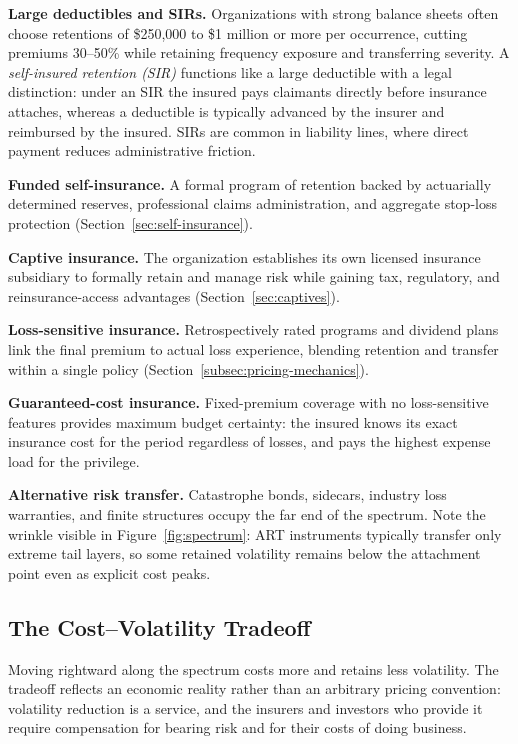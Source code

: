\documentclass[11pt,openany]{book}
\begin{document}
\textbf{Large deductibles and SIRs.} Organizations with strong balance sheets
often choose retentions of \$250,000 to \$1 million or more per occurrence,
cutting premiums 30--50\% while retaining frequency exposure and transferring
severity. A \emph{self-insured retention (SIR)} functions like a large
deductible with a legal distinction: under an SIR the insured pays claimants
directly before insurance attaches, whereas a deductible is typically
advanced by the insurer and reimbursed by the insured. SIRs are common in
liability lines, where direct payment reduces administrative friction.

\textbf{Funded self-insurance.} A formal program of retention backed by
actuarially determined reserves, professional claims administration, and
aggregate stop-loss protection (Section~\ref{sec:self-insurance}).

\textbf{Captive insurance.} The organization establishes its own licensed
insurance subsidiary to formally retain and manage risk while gaining tax,
regulatory, and reinsurance-access advantages (Section~\ref{sec:captives}).

\textbf{Loss-sensitive insurance.} Retrospectively rated programs and
dividend plans link the final premium to actual loss experience, blending
retention and transfer within a single policy
(Section~\ref{subsec:pricing-mechanics}).

\textbf{Guaranteed-cost insurance.} Fixed-premium coverage with no
loss-sensitive features provides maximum budget certainty: the insured knows
its exact insurance cost for the period regardless of losses, and pays the
highest expense load for the privilege.

\textbf{Alternative risk transfer.} Catastrophe bonds, sidecars, industry
loss warranties, and finite structures occupy the far end of the spectrum.
Note the wrinkle visible in Figure~\ref{fig:spectrum}: ART instruments
typically transfer only extreme tail layers, so some retained volatility
remains below the attachment point even as explicit cost peaks.

\subsection{The Cost--Volatility Tradeoff}
\label{subsec:cost-volatility}

Moving rightward along the spectrum costs more and retains less volatility.
The tradeoff reflects an economic reality rather than an arbitrary pricing
convention: volatility reduction is a service, and the insurers and investors
who provide it require compensation for bearing risk and for their costs of
doing business.
\end{document}
